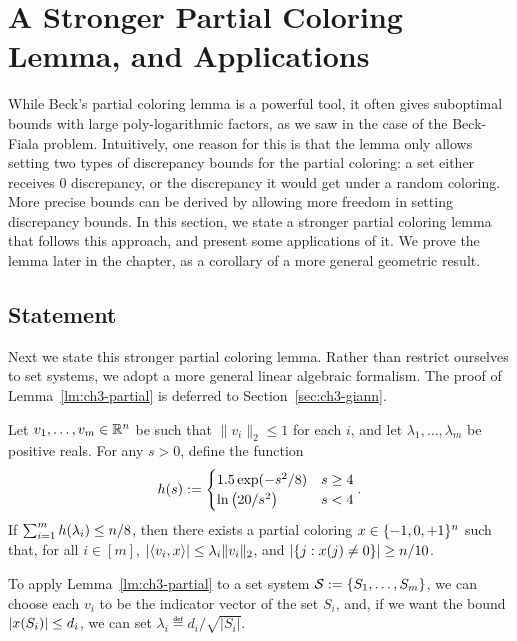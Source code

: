\section{A Stronger Partial Coloring Lemma, and Applications}

While Beck's partial coloring lemma is a powerful tool, it often gives
suboptimal bounds with large poly-logarithmic factors, as we saw in
the case of the Beck-Fiala problem. Intuitively, one reason for this
is that the lemma only allows setting two types of discrepancy bounds
for the partial coloring: a set either receives \(0\) discrepancy, or
the discrepancy it would get under a random coloring. More precise
bounds can be derived by allowing more freedom in setting discrepancy
bounds. In this section, we state a stronger partial coloring lemma
that follows this approach, and present some applications of it. We
prove the lemma later in the chapter, as a corollary of a more general
geometric result.

\subsection{Statement}

Next we state this stronger partial coloring lemma. Rather than
restrict ourselves to set systems, we adopt a more general linear
algebraic formalism. The proof of Lemma~\ref{lm:ch3-partial} is deferred to Section~\ref{sec:ch3-giann}.

\begin{lemma}\label{lm:ch3-partial}
  Let \(v_1, \ldots, v_m \in \mathbb{R}^n\) be such that \(\|v_i\|_2 \le 1\)
  for each \(i\), and let \(\lambda_1, \ldots, \lambda_m\) be
  positive reals. For any \(s > 0\), define the function
  \begin{equation}\label{eq:ch3-partial}
    h(s) :=  \begin{cases}
      1.5\exp(-s^2/8) & s\ge 4\\
      \ln\left(20/s^2\right) & s < {4}
    \end{cases}.
  \end{equation}
  If \(\sum_{i=1}^m h(\lambda_i) \le n/8\), then there exists a partial coloring
  \(x \in \{-1,0,+1\}^n\) such that, for all \(i \in [m]\),
  \(|\langle v_i,x\rangle| \le \lambda_i\|v_i\|_2\), and \(|\{j: x(j) \neq 0\}|
  \ge n/10\). 
\end{lemma}

To apply Lemma~\ref{lm:ch3-partial} to a set system
$\mathcal{S} := \{S_1, \ldots, S_m\}$, we can choose each $v_i$ to be the indicator vector of the set $S_i$, and, if we want the bound $|x(S_i)| \le d_i$,
we can set $\lambda_i \eqdef d_i/\sqrt{|S_i|}$.


